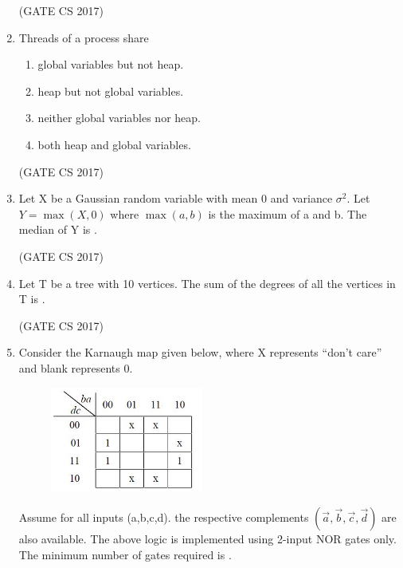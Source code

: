 \documentclass[a4paper, 11pt]{article}
\begin{document}
\begin{enumerate}
    \hfill (GATE CS 2017)
    
    \item Threads of a process share
    
    \begin{enumerate}
        \item global variables but not heap.
        \item heap but not global variables.
        \item neither global variables nor heap.
        \item both heap and global variables.
    \end{enumerate}
    
    \hfill (GATE CS 2017)
    
    \item Let X be a Gaussian random variable with mean 0 and variance $\sigma^{2}$. Let $Y=\max(X,0)$ where $\max(a,b)$ is the maximum of a and b. The median of Y is \underline{\hspace{2cm}}.
    
    \hfill (GATE CS 2017)
    
    \item Let T be a tree with 10 vertices. The sum of the degrees of all the vertices in T is \underline{\hspace{2cm}}.
    
    \hfill (GATE CS 2017)
    
    \item Consider the Karnaugh map given below, where X represents “don’t care” and blank represents 0.
    
    \begin{figure}[H]
        \centering
        \includegraphics[width=5cm, ]{figs/q21.png}
        \label{fig:placeholder}
    \end{figure}
    
    Assume for all inputs (a,b,c,d). the respective complements $(\vec{a},\vec{b}, \vec{c}, \vec{d})$ are also available. The  above logic is implemented using 2-input NOR gates only. The minimum number of gates required  is \underline{\hspace{2cm}}.
    

\end{enumerate}
\end{document}
